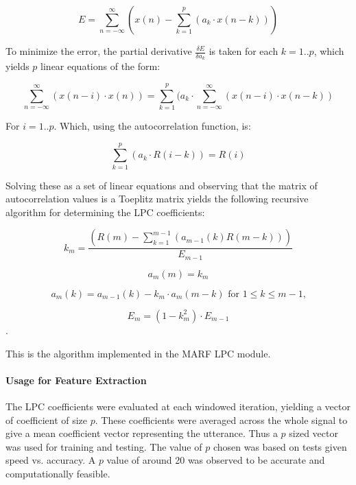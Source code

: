 $$ E = \displaystyle\sum_{n=-\infty}^{\infty}\left(x(n) - \displaystyle\sum_{k=1}^{p}(a_{k} \cdot x(n-k))\right) $$

To minimize the error, the partial derivative $\frac{{\delta}E}{{\delta}a_{k}}$ is
taken for each $k=1..p$, which yields $p$ linear equations of the form:

$$ \displaystyle\sum_{n=-\infty}^{\infty}(x(n-i) \cdot x(n)) = \displaystyle\sum_{k=1}^{p}(a_{k} \cdot \displaystyle\sum_{n=-\infty}^{\infty}(x(n-i) \cdot x(n-k)) $$

For $i=1..p$. Which, using the autocorrelation function, is:

$$ \displaystyle\sum_{k=1}^{p}(a_{k} \cdot R(i-k)) = R(i) $$

Solving these as a set of linear equations and observing that the
matrix of autocorrelation values is a Toeplitz matrix yields the
following recursive algorithm for determining the LPC coefficients:

$$ k_{m} = \frac{\left(R(m) - \displaystyle\sum_{k=1}^{m-1}\left(a_{m-1}(k)R(m-k)\right)\right)}{E_{m-1}} $$

$$ a_{m}(m) = k_{m} $$

$$ a_{m}(k) = a_{m-1}(k) - k_{m} \cdot a_{m}(m-k) \mbox{ for } 1 \le k \le m-1\mbox{,} $$

$$ E_{m} = (1 - k_{m}^2) \cdot E_{m-1} $$.

This is the algorithm implemented in the MARF LPC module.

\paragraph{Usage for Feature Extraction}

The LPC coefficients were evaluated at each windowed iteration,
yielding a vector of coefficient of size $p$. These coefficients were
averaged across the whole signal to give a mean coefficient vector
representing the utterance. Thus a $p$ sized vector was used for
training and testing. The value of $p$ chosen was based on tests given
speed vs. accuracy. A $p$ value of around 20 was observed to be accurate and
computationally feasible.
